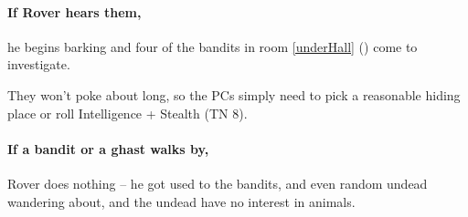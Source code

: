 \begin{multicols}{2}
\paragraph{If Rover hears them,}
he begins barking and four of the bandits in room \ref{underHall} () come to investigate.

They won't poke about long, so the PCs simply need to pick a reasonable hiding place or roll Intelligence + Stealth (TN 8).

\paragraph{If a bandit or a ghast walks by,}
Rover does nothing -- he got used to the bandits, and even random undead wandering about, and the undead have no interest in animals.


\vfill\null

\end{multicols}
